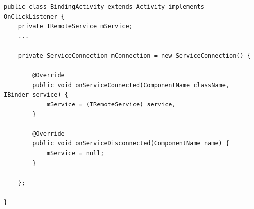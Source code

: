\begin{lstlisting}[frame=single]
public class BindingActivity extends Activity implements OnClickListener {
	private IRemoteService mService;
	...

	private ServiceConnection mConnection = new ServiceConnection() {

		@Override
		public void onServiceConnected(ComponentName className, IBinder service) {
			mService = (IRemoteService) service;
		}

		@Override
		public void onServiceDisconnected(ComponentName name) {
			mService = null;
		}

	};
	
}
\end{lstlisting}

